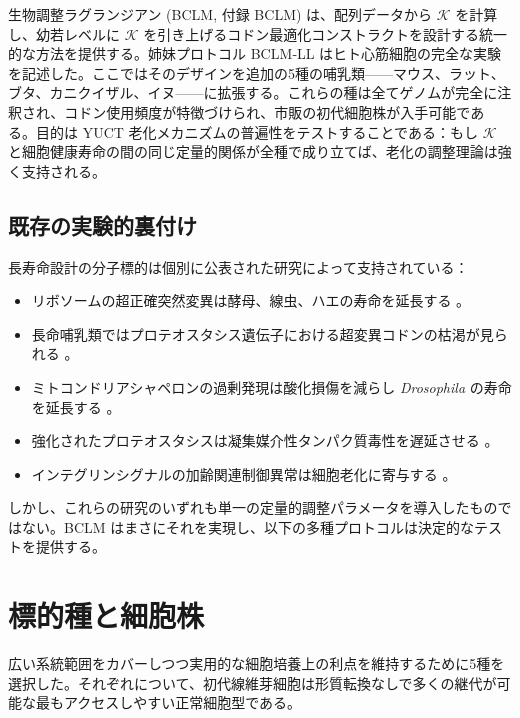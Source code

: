 \documentclass[12pt,a4paper]{ltjsarticle}
\newcommand{\REL}{\mathcal{K}}          %
\begin{document}
	生物調整ラグランジアン (BCLM, 付録 BCLM) は、配列データから \(\REL\) を計算し、幼若レベルに \(\REL\) を引き上げるコドン最適化コンストラクトを設計する統一的な方法を提供する。姉妹プロトコル BCLM‑LL はヒト心筋細胞の完全な実験を記述した。ここではそのデザインを追加の5種の哺乳類——マウス、ラット、ブタ、カニクイザル、イヌ——に拡張する。これらの種は全てゲノムが完全に注釈され、コドン使用頻度が特徴づけられ、市販の初代細胞株が入手可能である。目的は YUCT 老化メカニズムの普遍性をテストすることである：もし \(\REL\) と細胞健康寿命の間の同じ定量的関係が全種で成り立てば、老化の調整理論は強く支持される。
	
	\subsection{既存の実験的裏付け}
	長寿命設計の分子標的は個別に公表された研究によって支持されている：
	\begin{itemize}
		\item リボソームの超正確突然変異は酵母、線虫、ハエの寿命を延長する \cite{Bjedov2021}。
		\item 長命哺乳類ではプロテオスタシス遺伝子における超変異コドンの枯渇が見られる \cite{Kerekes2025}。
		\item ミトコンドリアシャペロンの過剰発現は酸化損傷を減らし \textit{Drosophila} の寿命を延長する \cite{Morrow2004}。
		\item 強化されたプロテオスタシスは凝集媒介性タンパク質毒性を遅延させる \cite{Walker2003}。
		\item インテグリンシグナルの加齢関連制御異常は細胞老化に寄与する \cite{Takeda2019}。
	\end{itemize}
	しかし、これらの研究のいずれも単一の定量的調整パラメータを導入したものではない。BCLM はまさにそれを実現し、以下の多種プロトコルは決定的なテストを提供する。
	
	\section{標的種と細胞株}
	\label{sec:species}
	広い系統範囲をカバーしつつ実用的な細胞培養上の利点を維持するために5種を選択した。それぞれについて、初代線維芽細胞は形質転換なしで多くの継代が可能な最もアクセスしやすい正常細胞型である。
	
\end{document}
